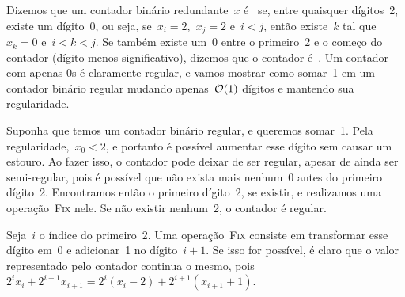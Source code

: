 \documentclass[../../main.tex]{subfiles}
\begin{document}
Dizemos que um contador binário redundante~$x$ é~ se, entre quaisquer dígitos~2, existe um dígito~0, ou seja, se~${x_i = 2}$,~${x_j = 2}$ e~$i < j$, então existe~$k$ tal que~${x_k = 0}$ e~${i < k < j}$. Se também existe um~0 entre o primeiro~2 e o começo do contador (dígito menos significativo), dizemos que o contador é~. Um contador com apenas 0s é claramente regular, e vamos mostrar como somar~1 em um contador binário regular mudando apenas~$\mathcal{O}(1)$ dígitos e mantendo sua regularidade.

Suponha que temos um contador binário regular, e queremos somar~1. Pela regularidade,~${x_0 < 2}$, e portanto é possível aumentar esse dígito sem causar um estouro. Ao fazer isso, o contador pode deixar de ser regular, apesar de ainda ser semi-regular, pois é possível que não exista mais nenhum~0 antes do primeiro dígito~2. Encontramos então o primeiro dígito~2, se existir, e realizamos uma operação~\textsc{Fix} nele. Se não existir nenhum~2, o contador é regular.

Seja~$i$ o índice do primeiro~2. Uma operação~\textsc{Fix} consiste em transformar esse dígito em~0 e adicionar~1 no dígito~$i+1$. Se isso for possível, é claro que o valor representado pelo contador continua o mesmo, pois~$2^i x_i + 2^{i+1} x_{i+1} = 2^i (x_i - 2) + 2^{i+1} (x_{i+1} + 1)$.
\end{document}
